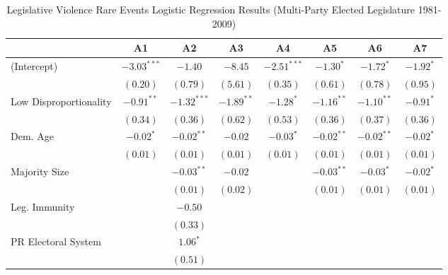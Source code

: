 \documentclass[a4paper]{article}\usepackage[]{graphicx}\usepackage[]{color}
\begin{document}
\begin{table}
\caption{Legislative Violence Rare Events Logistic Regression Results (Multi-Party Elected Legislature 1981-2009)}
\label{outputTable.dem}
\begin{center}

\begin{tabular}{l c c c c c c c }
\hline
                        & A1 & A2 & A3 & A4 & A5 & A6 & A7 \\
\hline
(Intercept)             & $-3.03^{***}$ & $-1.40$       & $-8.45$      & $-2.51^{***}$ & $-1.30^{*}$  & $-1.72^{*}$  & $-1.92^{*}$ \\
                        & $(0.20)$      & $(0.79)$      & $(5.61)$     & $(0.35)$      & $(0.61)$     & $(0.78)$     & $(0.95)$    \\
Low Disproportionality  & $-0.91^{**}$  & $-1.32^{***}$ & $-1.89^{**}$ & $-1.28^{*}$   & $-1.16^{**}$ & $-1.10^{**}$ & $-0.91^{*}$ \\
                        & $(0.34)$      & $(0.36)$      & $(0.62)$     & $(0.53)$      & $(0.36)$     & $(0.37)$     & $(0.36)$    \\
Dem. Age                & $-0.02^{*}$   & $-0.02^{**}$  & $-0.02$      & $-0.03^{*}$   & $-0.02^{**}$ & $-0.02^{**}$ & $-0.02^{*}$ \\
                        & $(0.01)$      & $(0.01)$      & $(0.01)$     & $(0.01)$      & $(0.01)$     & $(0.01)$     & $(0.01)$    \\
Majority Size           &               & $-0.03^{**}$  & $-0.02$      &               & $-0.03^{**}$ & $-0.03^{*}$  & $-0.02^{*}$ \\
                        &               & $(0.01)$      & $(0.02)$     &               & $(0.01)$     & $(0.01)$     & $(0.01)$    \\
Leg. Immunity           &               & $-0.50$       &              &               &              &              &             \\
                        &               & $(0.33)$      &              &               &              &              &             \\
PR Electoral System     &               & $1.06^{*}$    &              &               &              &              &             \\
                        &               & $(0.51)$      &              &               &              &              &             \\

\end{tabular}
\end{center}
\end{table}
\end{document}
